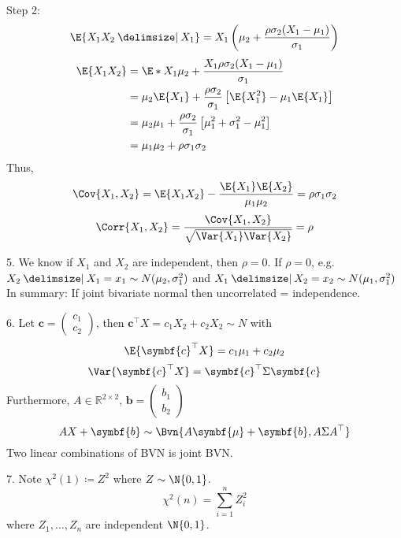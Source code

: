 Step 2:
\[ \E{X_1X_2\given X_1}=X_1
    \left(  \mu_2+\frac{\rho\sigma_2(X_1-\mu_1)}{\sigma_1} \right)
\]
\begin{align*}
    \E{X_1X_2}
     & = \E*{X_1\mu_2+\frac{X_1\rho\sigma_2(X_1-\mu_1)}{\sigma_1}}                         \\
     & =\mu_2\E{X_1}+\frac{\rho\sigma_2}{\sigma_1}
    \left[ \E{X_1^2}-\mu_1\E{X_1} \right]                                                  \\
     & =\mu_2\mu_1+\frac{\rho\sigma_2}{\sigma_1} \left[ \mu_1^2+\sigma_1^2-\mu_1^2 \right] \\
     & =\mu_1\mu_2+\rho\sigma_1\sigma_2
\end{align*}
Thus,
\[ \Cov{X_1,X_2}=\E{X_1X_2}-\frac{\E{X_1}\E{X_2}}{\mu_1\mu_2}=\rho\sigma_1\sigma_2  \]
\[ \Corr{X_1,X_2}=\frac{\Cov{X_1,X_2}}{\sqrt{\Var{X_1}\Var{X_2}}}=\rho  \]

5. We know if $ X_1 $ and $ X_2 $ are independent, then $ \rho=0 $.
If $ \rho=0 $, e.g. $ X_2\given X_1=x_1 \sim N(\mu_2,\sigma_1^2) $
and $ X_1\given X_2=x_2 \sim N(\mu_1,\sigma_1^2) $
In summary: If joint bivariate normal then uncorrelated = independence.

6. Let $ \symbf{c}=\begin{pmatrix}
        c_1 \\
        c_2
    \end{pmatrix} $, then
$ \symbf{c}^\top X=c_1X_2+c_2X_2 \sim N $ with
\[ \E{\symbf{c}^\top X}=c_1\mu_1+c_2\mu_2 \]
\[ \Var{\symbf{c}^\top X}=\symbf{c}^\top \Sigma\symbf{c} \]
Furthermore, $ A\in\mathbb{R}^{2\times 2} $,
$ \symbf{b}=\begin{pmatrix}
        b_1 \\
        b_2
    \end{pmatrix} $
\[ AX+\symbf{b} \sim \Bvn{A\symbf{\mu}+\symbf{b},A\Sigma A^\top} \]
Two linear combinations of BVN is joint BVN.\

7. Note $ \chi^2(1)\coloneq Z^2 $ where $ Z \sim \N{0,1} $.
\[ \chi^2(n)=
    \sum_{i=1}^{n} Z_i^2 \]
where $ Z_1,\ldots,Z_n $ are independent $ \N{0,1} $.
